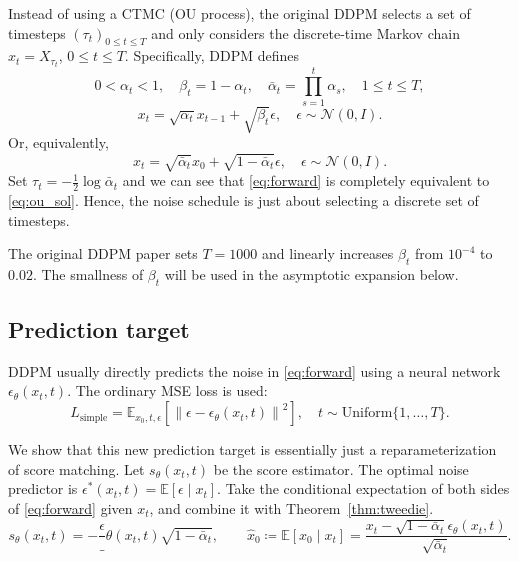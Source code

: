 \documentclass[11pt,a4paper]{article}
\theoremstyle{plain} %
\theoremstyle{definition}
\theoremstyle{remark}
\newcommand{\norm}[1]{\mathopen{}\left\lVert#1\right\rVert}
\newcommand{\N}{\mathbb{N}}
\newcommand{\E}{\mathbb{E}}
\renewcommand{\N}{\mathcal{N}}
\newcommand{\eps}{\epsilon_\theta(x_t,t)}
\newcommand{\sco}{s_\theta(x_t,t)}
\begin{document}
Instead of using a CTMC (OU process), the original DDPM selects a set of timesteps $(\tau_t)_{0\le t\le T}$ and only considers the discrete-time Markov chain $x_t = X_{\tau_t}$, $0\le t\le T$. Specifically, DDPM defines
\[0<\alpha_t<1,\quad \beta_t = 1-\alpha_t,\quad \bar\alpha_t=\prod_{s=1}^{t}\alpha_s,\quad 1\le t\le T,\]
\begin{equation}\label{eq:forward_one_step}
    x_t = \sqrt{\alpha_t}x_{t-1} + \sqrt{\beta_t}\epsilon,\quad\epsilon\sim\N(0,I).
\end{equation}
Or, equivalently,
\begin{equation}\label{eq:forward}
    x_t = \sqrt{\bar\alpha_t}x_0 + \sqrt{1-\bar\alpha_t}\epsilon,\quad\epsilon\sim\N(0,I).
\end{equation}
Set $\tau_t = -\frac12\log\bar\alpha_t$ and we can see that \eqref{eq:forward} is completely equivalent to \eqref{eq:ou_sol}. Hence, the noise schedule is just about selecting a discrete set of timesteps.

The original DDPM paper sets $T=1000$ and linearly increases $\beta_t$ from $10^{-4}$ to $0.02$. The smallness of $\beta_t$ will be used in the asymptotic expansion below.

\subsection{Prediction target}

DDPM usually directly predicts the noise in \eqref{eq:forward} using a neural network $\eps$. The ordinary MSE loss is used:
\[L_{\mathrm{simple}}=\E_{x_0,t,\epsilon}[\norm{\epsilon-\eps}^2],\quad t\sim\mathrm{Uniform}\{1,\dots,T\}.\]

We show that this new prediction target is essentially just a reparameterization of score matching. Let $\sco$ be the score estimator. The optimal noise predictor is $\epsilon^*(x_t,t)=\E[\epsilon\mid x_t]$. Take the conditional expectation of both sides of \eqref{eq:forward} given $x_t$, and combine it with Theorem~\ref{thm:tweedie}.
\begin{equation}\label{eq:score_x0_pred}
    \sco = -\frac\eps{\sqrt{1-\bar\alpha_t}},\qquad\hat x_0\coloneq\E[x_0\mid x_t]=\frac{x_t-\sqrt{1-\bar\alpha_t}\eps}{\sqrt{\bar\alpha_t}}.
\end{equation}
\end{document}
